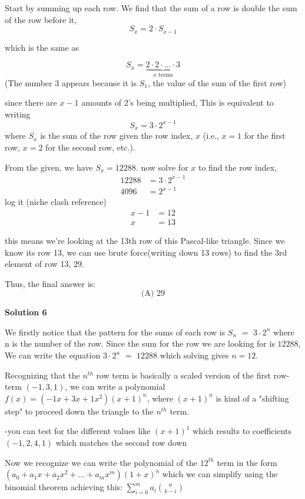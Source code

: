 \begin{enumerate}
Start by summing up each row. We find that the sum of a row is double the sum of the row before it,
 \[S_x=2 \cdot S_{x-1}\]

 which is the same as

 

 \[S_{x} = \underbrace{2 \cdot 2 \cdot \dots \cdot 3}_{x \text{ terms}}\](The number $3$ appears because it is $S_1$, the value of the sum of the first row)

 since there are $x-1$ amounts of $2$'s being multiplied,  This is equivalent to writing
 \[S_x = 3 \cdot 2^{x-1}\]where $S_x$ is the sum of the row given the row index, $x$ (i.e., $x=1$ for the first row, $x=2$ for the second row, etc.).

 From the given, we have $S_x = 12288$. now solve for $x$ to find the row index,\begin{align*}12288 &= 3 \cdot 2^{x-1} \\4096 &= 2^{x-1}\end{align*}
log it (niche clash reference)\begin{align*}x - 1 &= 12 \\x &= 13\end{align*}


 this means we're looking at the 13th row of this Pascal-like triangle. Since we know its row 13, we can use brute force(writing down 13 rows) to find the 3rd element of row 13, $29$.

 Thus, the final answer is:
 \[\boxed{\text{(A) } 29}\]




\textbf{Solution 6}

We firstly notice that the pattern for the sums of each row is $S_n$ $=$ $3 \cdot 2^n$ where n is the number of the row. Since the sum for the row we are looking for is $12288$, We can write the equation $3 \cdot 2^n$ $=$ $12288$ which solving gives $n = 12$.

 
Recognizing that the $n^{th}$ row term is basically a scaled version of the first row-term $(-1,3,1)$, we can write a polynomial      $f(x) = (-1x+3x+1x^2)(x+1)^n$, where $(x+1)^n$ is kind of a "shifting step" to proceed down the triangle to the $n^{th}$ term.

 
-you can test for the different values like $(x+1)^1$ which results to coefficients $(-1,2,4,1)$ which matches the second row down

 
Now we recognize we can write the polynomial of the $12^{th}$ term in the form $(a_0 + a_1 x + a_2 x^2 + \dots + a_m x^m)(1+x)^n$ which we can simplify using the binomial theorem achieving this: $\sum_{i=0}^{m} a_i \binom{n}{k-i}$ 


\end{enumerate}

